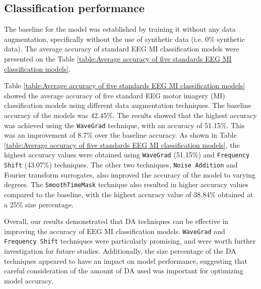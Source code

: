 \documentclass[12pt]{iopart}
\begin{document}
\subsection{Classification performance}
The baseline for the model was established by training it without any data augmentation, specifically without the use of synthetic data (i.e. 0\% synthetic data). The average accuracy of standard EEG MI classification models were presented on the Table \ref{table:Average accuracy of five standards EEG MI classification models}. 

Table \ref{table:Average accuracy of five standards EEG MI classification models} showed the average accuracy of five standard EEG motor imagery (MI) classification models using different data augmentation techniques. The baseline accuracy of the models was 42.45\%.  The results showed that the highest accuracy was achieved using the \texttt{WaveGrad} technique, with an accuracy of 51.15\%. This was an improvement of 8.7\% over the baseline accuracy. As shown in Table \ref{table:Average accuracy of five standards EEG MI classification models}, the highest accuracy values were obtained using \texttt{WaveGrad} (51.15\%) and \texttt{Frequency Shift} (43.07\%) techniques. The other two techniques, \texttt{Noise Addition} and Fourier transform surrogates, also improved the accuracy of the model to varying degrees. The \texttt{\texttt{SmoothTimeMask}} technique also resulted in higher accuracy values compared to the baseline, with the highest accuracy value of 38.84\% obtained at a 25\% size percentage.


Overall, our results demonstrated that DA techniques can be effective in improving the accuracy of EEG MI classification models. \texttt{WaveGrad} and \texttt{Frequency Shift} techniques were particularly promising, and were worth further investigation for future studies. Additionally, the size percentage of the DA techniques appeared to have an impact on model performance, suggesting that careful consideration of the amount of DA used was important for optimizing model accuracy. 
\end{document}

